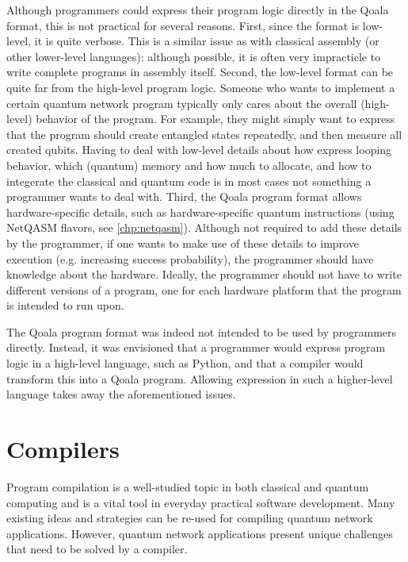 Although programmers could express their program logic directly in the Qoala format, this is not practical for several reasons.
First, since the format is low-level, it is quite verbose.
This is a similar issue as with classical assembly (or other lower-level languages): although possible, it is often very impracticle to write complete programs in assembly itself.
Second, the low-level format can be quite far from the high-level program logic.
Someone who wants to implement a certain quantum network program typically only cares about the overall (high-level) behavior of the program.
For example, they might simply want to express that the program should create entangled states repeatedly, and then measure all created qubits.
Having to deal with low-level details about how express looping behavior, which (quantum) memory and how much to allocate, and how to integerate the classical and quantum code
is in most cases not something a programmer wants to deal with. 
Third, the Qoala program format allows hardware-specific details, such as hardware-specific quantum instructions (using NetQASM flavors, see \cref{chp:netqasm}).
Although not required to add these details by the programmer, if one wants to make use of these details to improve execution (e.g. increasing success probability), the programmer should have knowledge about the hardware.
Ideally, the programmer should not have to write different versions of a program, one for each hardware platform that the program is intended to run upon.

The Qoala program format was indeed not intended to be used by programmers directly.
Instead, it was envisioned that a programmer would express program logic in a high-level language, such as Python, and that a compiler would transform this into a Qoala program.
Allowing expression in such a higher-level language takes away the aforementioned issues.

\section{Compilers}

Program compilation is a well-studied topic in both classical and quantum computing and is a vital tool in everyday practical software development.
Many existing ideas and strategies can be re-used for compiling quantum network applications.
However, quantum network applications present unique challenges that need to be solved by a compiler.

